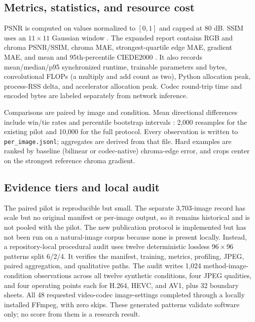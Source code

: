\documentclass[10pt,twocolumn]{article}
\newcommand{\code}[1]{\texttt{#1}}
\begin{document}
\subsection{Metrics, statistics, and resource cost}

PSNR is computed on values normalized to $[0,1]$ and capped at 80 dB.  SSIM uses
an $11\!\times\!11$ Gaussian window \cite{wang2004ssim}.  The expanded report
contains RGB and chroma PSNR/SSIM, chroma MAE, strongest-quartile edge MAE,
gradient MAE, and mean and 95th-percentile CIEDE2000
\cite{sharma2005ciede2000}.  It also records mean/median/p95 synchronized
runtime, trainable parameters and bytes, convolutional FLOPs (a multiply and add
count as two), Python allocation peak, process-RSS delta, and accelerator
allocation peak.  Codec round-trip time and encoded bytes are labeled separately
from network inference.

Comparisons are paired by image and condition.  Mean directional differences
include win/tie rates and percentile bootstrap intervals
\cite{efron1979bootstrap}: 2,000 resamples for the existing pilot and 10,000 for
the full protocol.  Every observation is written to \code{per\_image.jsonl};
aggregates are derived from that file.  Hard examples are ranked by baseline
(bilinear or codec-native) chroma-edge error, and crops center on the strongest
reference chroma gradient.

\subsection{Evidence tiers and local audit}

The paired pilot is reproducible but small.  The separate 3,703-image record has
scale but no original manifest or per-image output, so it remains historical and
is not pooled with the pilot.  The new publication protocol is implemented but
has not been run on a natural-image corpus because none is present locally.
Instead, a repository-local procedural audit uses twelve deterministic lossless
$96\!\times\!96$ patterns split 6/2/4.  It verifies the manifest, training,
metrics, profiling, JPEG, paired aggregation, and qualitative paths.  The audit
writes 1,024 method-image-condition observations across all twelve synthetic
conditions, four JPEG qualities, and four operating points each for H.264, HEVC,
and AV1, plus 32 boundary sheets.  All 48 requested video-codec image-settings
completed through a locally installed FFmpeg, with zero skips.  These generated
patterns validate software only; no score from them is a research result.
\end{document}
